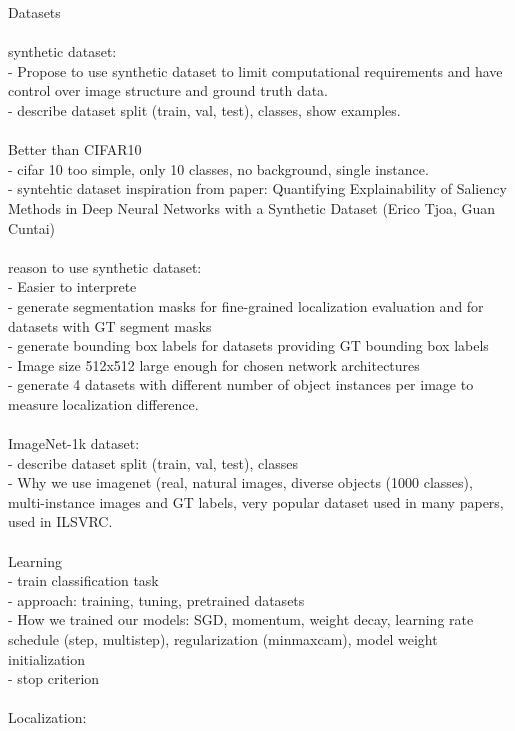 Datasets\\
\\
synthetic dataset:\\
- Propose to use synthetic dataset to limit computational requirements and have control over image structure and ground truth data.\\
- describe dataset split (train, val, test), classes, show examples.\\
\\
Better than CIFAR10\\
- cifar 10 too simple, only 10 classes, no background, single instance.\\
- syntehtic dataset inspiration from paper: Quantifying Explainability of Saliency Methods in Deep Neural Networks with a Synthetic Dataset (Erico Tjoa, Guan Cuntai)\\
\\
reason to use synthetic dataset:\\
- Easier to interprete\\
- generate segmentation masks for fine-grained localization evaluation and for datasets with GT segment masks\\
- generate bounding box labels for datasets providing GT bounding box labels\\
- Image size 512x512 large enough for chosen network architectures\\
- generate 4 datasets with different number of object instances per image to measure localization difference.\\
\\
ImageNet-1k dataset:\\
- describe dataset split (train, val, test), classes\\
- Why we use imagenet (real, natural images, diverse objects (1000 classes), multi-instance images and GT labels, very popular dataset used in many papers, used in ILSVRC.\\
\\
Learning\\
- train classification task\\
- approach: training, tuning, pretrained datasets\\
- How we trained our models: SGD, momentum, weight decay, learning rate schedule (step, multistep), regularization (minmaxcam), model weight initialization\\
- stop criterion\\
\\
Localization:\\
